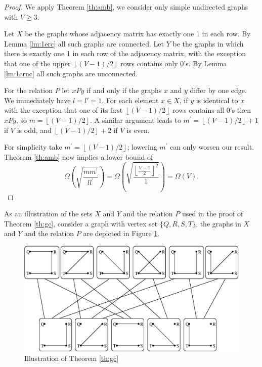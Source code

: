 \begin{proof}
We apply Theorem \ref{th:amb}, we consider only simple undirected
graphs with $V \ge 3$. 

Let $X$ be the graphs whose adjacency matrix has exactly one 1 in each
row.  By Lemma \ref{lm:1erc} all such graphs are connected. Let $Y$ be
the graphs in which there is exactly one 1 in each row of the
adjacency matrix, with the exception that one of the upper
$\left\lfloor(V-1)/2\right\rfloor$ rows contains only 0's.  By Lemma
\ref{lm:1ernc} all such graphs are unconnected.

For the relation $P$ let $xPy$ if and only if the graphs $x$ and $y$
differ by one edge.  We immediately have $l = l' = 1$.  For each
element $x \in X$, if $y$ is identical to $x$ with the exception that
one of its first $\left\lfloor(V-1)/2\right\rfloor$ rows contains all
$0$'s then $xPy$, so $m = \left\lfloor(V-1)/2\right\rfloor$.  A
similar argument leads to $m^{\prime} =
\left\lfloor(V-1)/2\right\rfloor + 1$ if $V$ is odd, and
$\left\lfloor(V-1)/2\right\rfloor + 2$ if $V$ is even.

For simplicity take $m^{\prime} =
\left\lfloor(V-1)/2\right\rfloor$;  lowering
$m^{\prime}$ can only worsen our result.  Theorem \ref{th:amb} now
implies a lower bound of
\[\Omega\left(\sqrt{\frac{mm^{\prime}}{ll^{\prime}}}\right) = 
\Omega\left(\sqrt{\frac{\left\lfloor\frac{V-1}{2}\right\rfloor^{2}}{1}}\right) = 
\Omega\left(V\right) 
.\]
\end{proof}

As an illustration of the sets $X$ and $Y$ and the relation $P$ used
in the proof of Theorem \ref{th:gc}, consider a graph with vertex set
$\{Q,R,S,T\}$, the graphs in $X$ and $Y$ and the relation $P$ are
depicted in Figure \ref{fi:gc}.

\begin{figure}
\begin{center}
\includegraphics{figures/conn2.eps}
\caption{\label{fi:gc} Illustration of Theorem \ref{th:gc}}
\end{center}
\end{figure}

